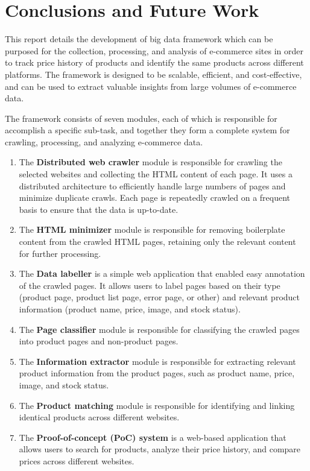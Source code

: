 \chapter{Conclusions and Future Work}
\label{ch:conclusions}

This report details the development of big data framework which can be purposed for the collection, processing, and analysis of e-commerce sites in order to track price history of products and identify the same products across different platforms.
The framework is designed to be scalable, efficient, and cost-effective, and can be used to extract valuable insights from large volumes of e-commerce data.

The framework consists of seven modules, each of which is responsible for accomplish a specific sub-task, and together they form a complete system for crawling, processing, and analyzing e-commerce data.
\begin{enumerate}
    \item The \textbf{Distributed web crawler} module is responsible for crawling the selected websites and collecting the HTML content of each page.
    It uses a distributed architecture to efficiently handle large numbers of pages and minimize duplicate crawls.
    Each page is repeatedly crawled on a frequent basis to ensure that the data is up-to-date.

    \item The \textbf{HTML minimizer} module is responsible for removing boilerplate content from the crawled HTML pages, retaining only the relevant content for further processing.

    \item The \textbf{Data labeller} is a simple web application that enabled easy annotation of the crawled pages.
    It allows users to label pages based on their type (product page, product list page, error page, or other) and relevant product information (product name, price, image, and stock status).

    \item The \textbf{Page classifier} module is responsible for classifying the crawled pages into product pages and non-product pages.

    \item The \textbf{Information extractor} module is responsible for extracting relevant product information from the product pages, such as product name, price, image, and stock status.

    \item The \textbf{Product matching} module is responsible for identifying and linking identical products across different websites.

    \item The \textbf{Proof-of-concept (PoC) system} is a web-based application that allows users to search for products, analyze their price history, and compare prices across different websites.
\end{enumerate}

